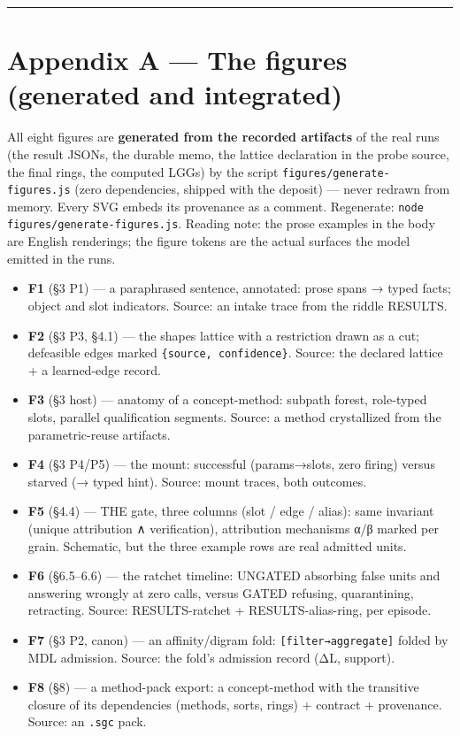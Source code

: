 \documentclass[11pt]{article}
\begin{document}
\medskip\hrule\medskip

\section*{Appendix A — The figures (generated and integrated)}

All eight figures are \textbf{generated from the recorded artifacts} of the real runs (the result JSONs, the durable memo, the lattice declaration in the probe source, the final rings, the computed LGGs) by the script \texttt{figures/\allowbreak{}generate-figures.js} (zero dependencies, shipped with the deposit) — never redrawn from memory. Every SVG embeds its provenance as a comment. Regenerate: \texttt{node figures/\allowbreak{}generate-figures.js}. Reading note: the prose examples in the body are English renderings; the figure tokens are the actual surfaces the model emitted in the runs.

\begin{itemize}
\item \textbf{F1} (§3 P1) — a paraphrased sentence, annotated: prose spans → typed facts; object and slot indicators. Source: an intake trace from the riddle RESULTS.
\item \textbf{F2} (§3 P3, §4.1) — the shapes lattice with a restriction drawn as a cut; defeasible edges marked \texttt{\{source, confidence\}}. Source: the declared lattice + a learned-edge record.
\item \textbf{F3} (§3 host) — anatomy of a concept-method: subpath forest, role-typed slots, parallel qualification segments. Source: a method crystallized from the parametric-reuse artifacts.
\item \textbf{F4} (§3 P4/P5) — the mount: successful (params→slots, zero firing) versus starved (→ typed hint). Source: mount traces, both outcomes.
\item \textbf{F5} (§4.4) — THE gate, three columns (slot / edge / alias): same invariant (unique attribution ∧ verification), attribution mechanisms α/β marked per grain. Schematic, but the three example rows are real admitted units.
\item \textbf{F6} (§6.5–6.6) — the ratchet timeline: UNGATED absorbing false units and answering wrongly at zero calls, versus GATED refusing, quarantining, retracting. Source: RESULTS-ratchet + RESULTS-alias-ring, per episode.
\item \textbf{F7} (§3 P2, canon) — an affinity/digram fold: \texttt{[filter→aggregate]} folded by MDL admission. Source: the fold's admission record (ΔL, support).
\item \textbf{F8} (§8) — a method-pack export: a concept-method with the transitive closure of its dependencies (methods, sorts, rings) + contract + provenance. Source: an \texttt{.sgc} pack.
\end{itemize}
\end{document}
